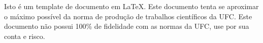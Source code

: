 \begin{resumo}
Isto é um template de documento em \LaTeX. Este documento tenta se
aproximar o máximo possível da norma de produção de trabalhos
científicos da UFC. Este documento não possui 100\% de fidelidade
com as normas da UFC, use por sua conta e risco.

\noindent
\palavraschave
\end{resumo}
\pagebreak
